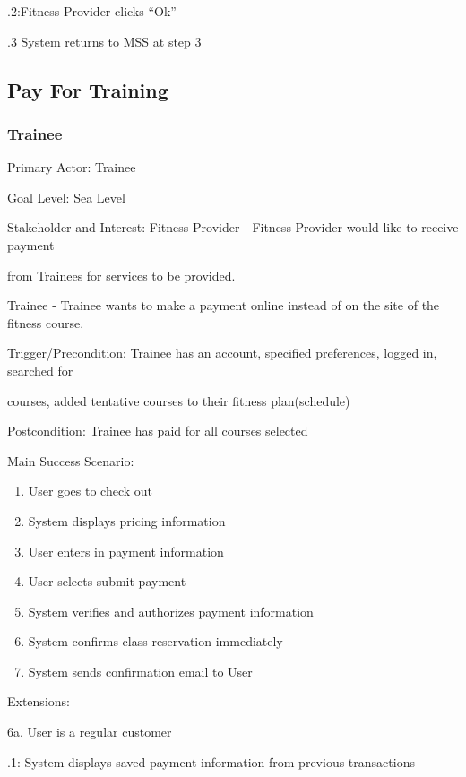 \documentclass[12pt]{article}
\begin{document}
	.2:Fitness Provider clicks “Ok”
	
	.3 System returns to MSS at step 3

\subsection{Pay For Training}
\subsubsection{Trainee}

\noindent Primary Actor: Trainee

\noindent Goal Level: Sea Level
\newline

\noindent Stakeholder and Interest: Fitness Provider - Fitness Provider would like to receive payment 

from Trainees for services to be provided.

\noindent Trainee - Trainee wants to make a payment online instead of on the site of the fitness course.
\newline

\noindent Trigger/Precondition: Trainee has an account, specified preferences, logged in, searched for 

courses, added tentative courses to their fitness plan(schedule)

\noindent Postcondition: Trainee has paid for all courses selected
\newline

\noindent Main Success Scenario: 
\begin{enumerate}
\item User goes to check out
\item System displays pricing information
\item User enters in payment information 
\item User selects submit payment
\item System verifies and authorizes payment information
\item System confirms class reservation immediately
\item System sends confirmation email to User
\end{enumerate}


\noindent Extensions: 

\noindent 6a. User is a regular customer

	.1: System displays saved payment information from previous transactions
	
\end{document}
